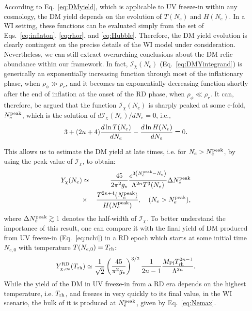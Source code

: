 \documentclass[notitlepage,nofootinbib,preprintnumbers,aps,superscriptaddress,twocolumn]{revtex4-1}
\begin{document}
According to Eq.~\eqref{eq:DMyield}, which is applicable to UV freeze-in within any cosmology, the DM yield depends on the evolution of $T(N_e)$ and $H(N_e)$. In a WI setting, these functions can be evaluated simply from the set of Eqs.~\eqref{eq:inflaton}, \eqref{eq:rhor}, and \eqref{eq:Hubble}. Therefore, the DM yield evolution is clearly contingent on the precise details of the WI model under consideration.
Nevertheless, we can still extract overarching conclusions about the DM relic abundance within our framework. In fact, $\mathcal{I}_\chi(N_e)$ (Eq.~\eqref{eq:DMYintegrand}) is generically an exponentially increasing function through most of the inflationary phase, when $\rho_\phi\gg \rho_r$, and it becomes an exponentially decreasing function shortly after the end of inflation at the onset of the RD phase, when $\rho_\phi\ll \rho_r$. It can, therefore, be argued that the function $\mathcal{I}_\chi(N_e)$ 
is sharply peaked at some e-fold, $N_{e}^{\rm{peak}}$, which is the solution of  $d \mathcal{I}_\chi(N_e) / dN_e = 0$, i.e.,
\begin{equation}
 3+(2n+4)\frac{d\,{\rm ln}\,T(N_e)}{dN_e}-\frac{d\,{\rm ln}\,H(N_e)}{dN_e}=0.
 \label{eq:Nemax}
\end{equation}

This allows us to estimate the DM yield at late times, i.e. for $N_e> N_e^{\rm{peak}}$, by using the peak value of $\mathcal{I}_\chi$, to obtain:
\begin{eqnarray}
   \nonumber Y_\chi(N_e)&\simeq&\frac{45}{2\pi^2g_{\star}}\frac{e^{3\left(N_{e}^{\rm peak}-N_e\right)}}{\Lambda^{2n}T^3(N_e)}\Delta N_{e}^{\rm peak} \\
   &\times& \frac{T^{2n+4}(N_e^{\rm peak})}{ H(N_e^{\rm peak})}, \quad (N_e> N_e^{\rm{peak}}),
   \label{eq:estY}
\end{eqnarray}
where $\Delta N_e^{\rm{peak}}\gtrsim 1$ denotes the
half-width of $\mathcal{I}_\chi$.
To better understand the importance of this result, one can compare it with the final yield of DM produced from UV freeze-in (Eq.~\eqref{eq:nchi}) in a RD epoch which starts at some initial time $N_{e, 0}$ with temperature $T(N_{e, 0})=T_{\rm rh}$:
\begin{equation}
Y^{\rm{RD}}_{\chi,\infty}(T_{\rm rh})\simeq \frac{1}{\sqrt{2}}\left(\frac{45}{\pi^2 g_\star}\right)^{3/2}\frac{1}{2n-1}\frac{M_{\rm{Pl}}T_{\rm{rh}}^{2n-1}}{\Lambda^{2n}}. 
    \label{eq:YDMRD}
\end{equation}
While the yield of the DM in UV freeze-in from a RD era depends on the highest temperature, i.e. $T_{\rm{rh}}$, and freezes in very quickly to its final value, in the WI scenario, the bulk of it is produced at $N_e^{\rm peak}$, given by Eq.~\eqref{eq:Nemax}. 
\end{document}
